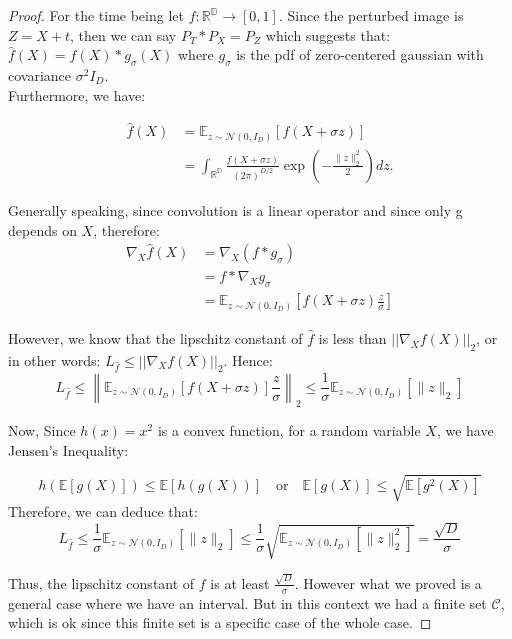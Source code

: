 \documentclass{article}
\theoremstyle{plain}
\theoremstyle{definition}
\theoremstyle{remark}
\begin{document}
\begin{proof}
For the time being let $f:\mathbb{R^D}\to[0,1]$. Since the perturbed image is $ Z = X+t$, then we can say $P_T*P_X = P_{Z}$ which suggests that: $\hat{f}(X) = f(X)*g_\sigma(X)$ where $g_\sigma$ is the pdf of zero-centered gaussian with covariance $\sigma^2 I_D$.
\\
Furthermore, we have:

\begin{align*}
    \hat{f}(X) &= \mathbb{E}_{z \sim \mathcal{N}(0, I_D)}[f(X + \sigma z)] \\
    &= \int_\mathbb{R^D} \frac{f(X + \sigma z)}{(2\pi)^{D/2}} \exp\left(-\frac{\|z\|_2^2}{2}\right) dz.
\end{align*}

Generally speaking, since convolution is a linear operator and since only g depends on $X$, therefore:
\begin{align*}
\nabla_X \hat{f}(X) &= \nabla_X (f * g_{\sigma}) \\
&= f * \nabla_X g_{\sigma} \\
&= \mathbb{E}_{z \sim \mathcal{N}(0, I_D)} \left[ f(X + \sigma z) \frac{z}{\sigma} \right]
\end{align*}

However, we know that the lipschitz constant of $\hat{f}$ is less than $|| \nabla_X f(X)||_2$, or in other words:
$L_{\hat{f}} \leq || \nabla_X f(X)||_2$. Hence:
\begin{equation*}
    L_{\hat{f}} \leq \left\| \mathbb{E}_{z \sim \mathcal{N}(0, I_D)}[f(X + \sigma z)]  \frac{z}{\sigma} \right\|_2 \leq 
    \frac{1}{\sigma} \mathbb{E}_{z \sim \mathcal{N}(0, I_D)}[\|z\|_2]
\end{equation*}

Now, Since \( h(x) = x^2 \) is a convex function, for a random variable \( X \), we have Jensen’s Inequality:

\[
h(\mathbb{E}[g(X)]) \leq \mathbb{E}[h(g(X))] \quad \text{or} \quad \mathbb{E}[g(X)] \leq \sqrt{\mathbb{E}[g^2(X)]}
\]
Therefore, we can deduce that: 
\[
 L_{\hat{f}} \leq 
\frac{1}{\sigma} \mathbb{E}_{z \sim \mathcal{N}(0, I_D)}[\|z\|_2] \leq
\frac{1}{\sigma} \sqrt{\mathbb{E}_{z \sim \mathcal{N}(0, I_D)}[\|z\|_2^2]} = \frac{\sqrt{D}}{\sigma}
\]

Thus, the lipschitz constant of $f$ is at least $\frac{\sqrt{D}}{\sigma}$. However what we proved is a general case where we have an interval. But in this context we had a finite set $\mathcal{C}$, which is ok since this finite set is a specific case of the whole case.


\end{proof}
\end{document}
